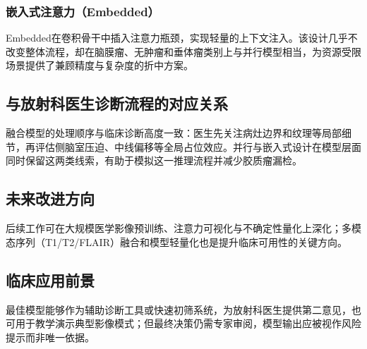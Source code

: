 \subsubsection{嵌入式注意力（Embedded）}

Embedded在卷积骨干中插入注意力瓶颈，实现轻量的上下文注入。该设计几乎不改变整体流程，却在脑膜瘤、无肿瘤和垂体瘤类别上与并行模型相当，为资源受限场景提供了兼顾精度与复杂度的折中方案。

\subsection{与放射科医生诊断流程的对应关系}

融合模型的处理顺序与临床诊断高度一致：医生先关注病灶边界和纹理等局部细节，再评估侧脑室压迫、中线偏移等全局占位效应。并行与嵌入式设计在模型层面同时保留这两类线索，有助于模拟这一推理流程并减少胶质瘤漏检。

\subsection{未来改进方向}

后续工作可在大规模医学影像预训练、注意力可视化与不确定性量化上深化；多模态序列（T1/T2/FLAIR）融合和模型轻量化也是提升临床可用性的关键方向。

\subsection{临床应用前景}

最佳模型能够作为辅助诊断工具或快速初筛系统，为放射科医生提供第二意见，也可用于教学演示典型影像模式；但最终决策仍需专家审阅，模型输出应被视作风险提示而非唯一依据。
